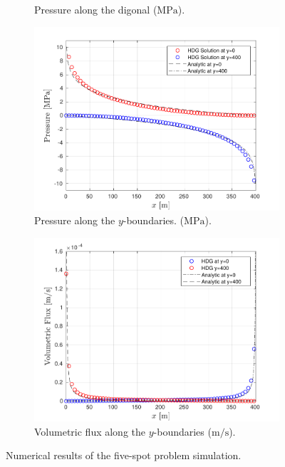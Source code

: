 \documentclass[review]{elsarticle}
\begin{document}
\begin{figure}[H]
\begin{subfigure}[b]{0.5\textwidth}
	\caption[Test geometry 1]{Pressure along the digonal ($\mathrm{MPa}$).}
	\label{fig:5puntos1_Diag}
	\end{subfigure}
	\begin{subfigure}[b]{0.5\textwidth}
		\includegraphics[width=\textwidth]{./Figures/Examples/FiveSpot/5spot1_BoundSol.pdf}
		\caption[Test geometry 1]{Pressure along the $y$-boundaries. ($\mathrm{MPa}$).}
		\label{fig:5puntos1_boundSol}
	\end{subfigure}\quad
    \begin{subfigure}[b]{0.5\textwidth}
		\includegraphics[width=\textwidth]{./Figures/Examples/FiveSpot/5spot1_BoundGrad.pdf}
		\caption[Test geometry 1]{Volumetric flux along the $y$-boundaries ($\mathrm{m}/\mathrm{s}$).}
		\label{fig:5puntos1_limit}
	\end{subfigure}
	\caption{Numerical results of the five-spot problem simulation.}
	\label{fig:fiveResults}
\end{figure}
\end{document}
